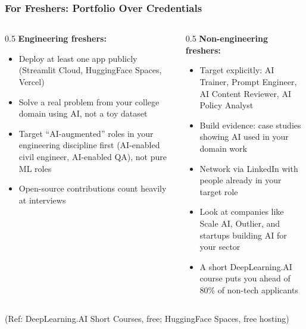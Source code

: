 \begin{frame}[fragile]\frametitle{For Freshers: Portfolio Over Credentials}

\begin{columns}
    \begin{column}[T]{0.5\linewidth}
\textbf{Engineering freshers:}
\begin{itemize}
\item Deploy at least one app publicly (Streamlit Cloud, HuggingFace Spaces, Vercel)
\item Solve a real problem from your college domain using AI, not a toy dataset
\item Target ``AI-augmented'' roles in your engineering discipline first (AI-enabled civil engineer, AI-enabled QA), not pure ML roles
\item Open-source contributions count heavily at interviews
\end{itemize}
    \end{column}
    \begin{column}[T]{0.5\linewidth}
\textbf{Non-engineering freshers:}
\begin{itemize}
\item Target explicitly: AI Trainer, Prompt Engineer, AI Content Reviewer, AI Policy Analyst
\item Build evidence: case studies showing AI used in your domain work
\item Network via LinkedIn with people already in your target role
\item Look at companies like Scale AI, Outlier, and startups building AI for your sector
\item A short DeepLearning.AI course puts you ahead of 80\% of non-tech applicants
\end{itemize}
    \end{column}
\end{columns}

\vspace{0.1cm}
{\tiny (Ref: DeepLearning.AI Short Courses, free; HuggingFace Spaces, free hosting)}

\end{frame}


